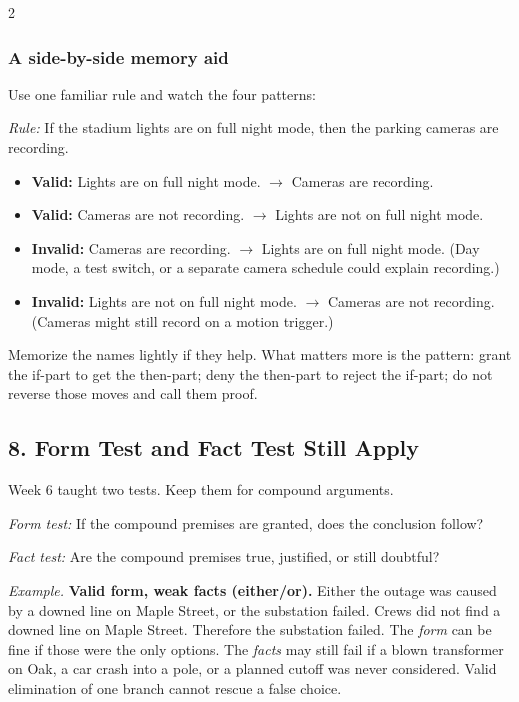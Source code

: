 \documentclass[12pt]{article}
\newcommand{\exbox}[1]{\par\vspace{0.2em}\noindent\textit{Example.} #1\par\vspace{0.15em}}
\begin{document}
\begin{multicols}{2}
\subsubsection*{A side-by-side memory aid}
Use one familiar rule and watch the four patterns:

\textit{Rule:} If the stadium lights are on full night mode, then the parking cameras are recording.

\begin{itemize}[leftmargin=*,itemsep=0.08em]
\item \textbf{Valid:} Lights are on full night mode. $\rightarrow$ Cameras are recording.
\item \textbf{Valid:} Cameras are not recording. $\rightarrow$ Lights are not on full night mode.
\item \textbf{Invalid:} Cameras are recording. $\rightarrow$ Lights are on full night mode. (Day mode, a test switch, or a separate camera schedule could explain recording.)
\item \textbf{Invalid:} Lights are not on full night mode. $\rightarrow$ Cameras are not recording. (Cameras might still record on a motion trigger.)
\end{itemize}

Memorize the names lightly if they help. What matters more is the pattern: grant the if-part to get the then-part; deny the then-part to reject the if-part; do not reverse those moves and call them proof.

\subsection*{8. Form Test and Fact Test Still Apply}
Week 6 taught two tests. Keep them for compound arguments.

\textit{Form test:} If the compound premises are granted, does the conclusion follow?

\textit{Fact test:} Are the compound premises true, justified, or still doubtful?

\exbox{\textbf{Valid form, weak facts (either/or).} Either the outage was caused by a downed line on Maple Street, or the substation failed. Crews did not find a downed line on Maple Street. Therefore the substation failed. The \textit{form} can be fine if those were the only options. The \textit{facts} may still fail if a blown transformer on Oak, a car crash into a pole, or a planned cutoff was never considered. Valid elimination of one branch cannot rescue a false choice.}


\end{multicols}
\end{document}

